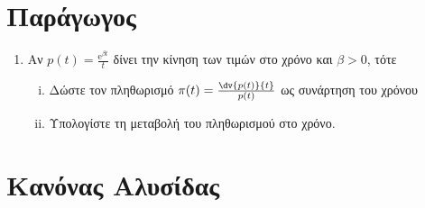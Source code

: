 


\pagestyle{vangelis}



\begin{center}
  \minibox{\large\bfseries \textcolor{Col1}{Θέματα Εξετάσεων}}
\end{center}

\vspace{\baselineskip}

\section{Παράγωγος}

\begin{enumerate}
  \item Αν $ p(t)= \frac{\mathrm{e}^{\beta t}}{t} $ δίνει την κίνηση των τιμών στο χρόνο 
    και $ \beta > 0 $, τότε 
    \begin{enumerate}[i)]
      \item Δώστε τον πληθωρισμό $ \pi (t) = \frac{\dv{p(t)}{t}}{p(t)} $ ως συνάρτηση του
        χρόνου 
      \item Υπολογίστε τη μεταβολή του πληθωρισμού στο χρόνο.
    \end{enumerate}
\end{enumerate}

\section{Κανόνας Αλυσίδας}

